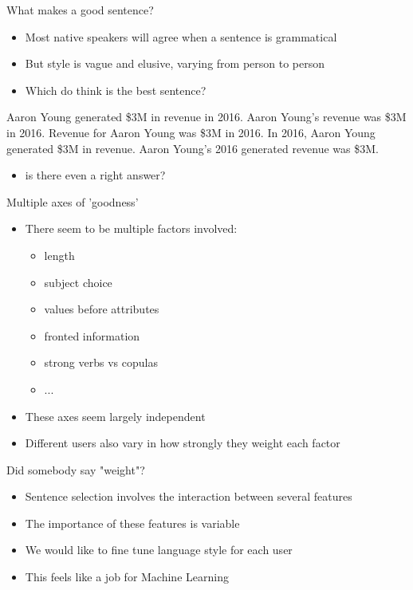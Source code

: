 \documentclass[10pt, compress]{beamer}
\begin{document}
\begin{frame}{What makes a good sentence?}
    \begin{itemize}
        \item Most native speakers will agree when a sentence is grammatical
        \item But style is vague and elusive, varying from person to person   \pause
        \item Which do think is the best sentence?
    \end{itemize}
    
    \begin{exe}
    	\ex \begin{xlist}
	        \ex Aaron Young generated \$3M in revenue in 2016.
	        \ex Aaron Young's revenue was \$3M in 2016.
	        \ex Revenue for Aaron Young was \$3M in 2016.
	        \ex In 2016, Aaron Young generated \$3M in revenue.
	        \ex Aaron Young's 2016 generated revenue was \$3M.
	    \end{xlist}
    \end{exe}

    \pause
    \begin{itemize}
    	\item is there even a right answer?
    \end{itemize}
\end{frame}

\begin{frame}{Multiple axes of 'goodness'}
	\begin{itemize}
		\item There seem to be multiple factors involved:
		\begin{itemize}
			\item length
			\item subject choice
			\item values before attributes
			\item fronted information
			\item strong verbs vs copulas
			\item ...	\pause
		\end{itemize}
		\item These axes seem largely independent	
		\item Different users also vary in how strongly they weight each factor
	\end{itemize}
\end{frame}

\begin{frame}{Did somebody say "weight"?}
	\begin{itemize}
		\item Sentence selection involves the interaction between several features
		\item The importance of these features is variable
		\item We would like to fine tune language style for each user \pause
		\item This feels like a job for Machine Learning
	\end{itemize}
\end{frame}
\end{document}
